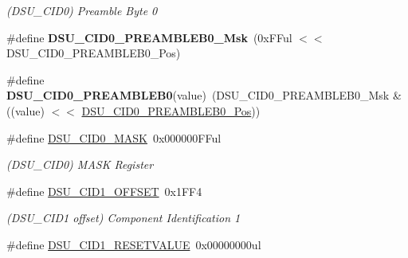 \begin{DoxyCompactItemize}
\begin{DoxyCompactList}\small\item\em (D\+S\+U\+\_\+\+C\+I\+D0) Preamble Byte 0 \end{DoxyCompactList}\item 
\hypertarget{group___s_a_m_l21___d_s_u_gaccaacf599c31ea471efbdf7838d26de6}{}\#define {\bfseries D\+S\+U\+\_\+\+C\+I\+D0\+\_\+\+P\+R\+E\+A\+M\+B\+L\+E\+B0\+\_\+\+Msk}~(0x\+F\+Ful $<$$<$ D\+S\+U\+\_\+\+C\+I\+D0\+\_\+\+P\+R\+E\+A\+M\+B\+L\+E\+B0\+\_\+\+Pos)\label{group___s_a_m_l21___d_s_u_gaccaacf599c31ea471efbdf7838d26de6}

\item 
\hypertarget{group___s_a_m_l21___d_s_u_ga38870d39881d4e6cbacc18de7a44529c}{}\#define {\bfseries D\+S\+U\+\_\+\+C\+I\+D0\+\_\+\+P\+R\+E\+A\+M\+B\+L\+E\+B0}(value)~(D\+S\+U\+\_\+\+C\+I\+D0\+\_\+\+P\+R\+E\+A\+M\+B\+L\+E\+B0\+\_\+\+Msk \& ((value) $<$$<$ \hyperlink{group___s_a_m_l21___d_s_u_ga684c02c36c7acb7066c55e248c85c44e}{D\+S\+U\+\_\+\+C\+I\+D0\+\_\+\+P\+R\+E\+A\+M\+B\+L\+E\+B0\+\_\+\+Pos}))\label{group___s_a_m_l21___d_s_u_ga38870d39881d4e6cbacc18de7a44529c}

\item 
\hypertarget{group___s_a_m_l21___d_s_u_ga7c41f1841c69429dc59c6466b4fc0742}{}\#define \hyperlink{group___s_a_m_l21___d_s_u_ga7c41f1841c69429dc59c6466b4fc0742}{D\+S\+U\+\_\+\+C\+I\+D0\+\_\+\+M\+A\+S\+K}~0x000000\+F\+Ful\label{group___s_a_m_l21___d_s_u_ga7c41f1841c69429dc59c6466b4fc0742}

\begin{DoxyCompactList}\small\item\em (D\+S\+U\+\_\+\+C\+I\+D0) M\+A\+S\+K Register \end{DoxyCompactList}\item 
\hypertarget{group___s_a_m_l21___d_s_u_ga1000fee5818fa48da89833ca079a3a5c}{}\#define \hyperlink{group___s_a_m_l21___d_s_u_ga1000fee5818fa48da89833ca079a3a5c}{D\+S\+U\+\_\+\+C\+I\+D1\+\_\+\+O\+F\+F\+S\+E\+T}~0x1\+F\+F4\label{group___s_a_m_l21___d_s_u_ga1000fee5818fa48da89833ca079a3a5c}

\begin{DoxyCompactList}\small\item\em (D\+S\+U\+\_\+\+C\+I\+D1 offset) Component Identification 1 \end{DoxyCompactList}\item 
\hypertarget{group___s_a_m_l21___d_s_u_ga0ddd2062d17bc1957afe23b2f02a46bd}{}\#define \hyperlink{group___s_a_m_l21___d_s_u_ga0ddd2062d17bc1957afe23b2f02a46bd}{D\+S\+U\+\_\+\+C\+I\+D1\+\_\+\+R\+E\+S\+E\+T\+V\+A\+L\+U\+E}~0x00000000ul\label{group___s_a_m_l21___d_s_u_ga0ddd2062d17bc1957afe23b2f02a46bd}


\end{DoxyCompactItemize}
